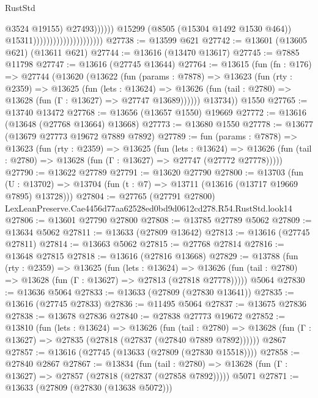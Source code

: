 \begin{lexlean}{RustStd}
\begin{coremodule}
                                                            @3524
                                                            @19155)
                                                          @27493))))))
                                              @15299
                                              (@8505 (@15304 @1492 @1530 @464))
                                              @15311)))))))))))))))))))))
@27738 := @13599 @621
@27742 := @13601 (@13605 @621) (@13611 @621)
@27744 := @13616 (@13470 @13617)
@27745 := @7885 @11798
@27747 := @13616 (@27745 @13644)
@27764 := @13615
    (fun (fn : @176) =>
    @27744
      (@13620
        (@13622
          (fun (params : @7878) =>
          @13623
            (fun (rty : @2359) =>
            @13625
              (fun (lets : @13624) =>
              @13626 (fun (tail : @2780) => @13628 (fun (Γ : @13627) => @27747 @13689))))))
        @13734))
    @1550
@27765 := @13740 @13472
@27768 := @13656 (@13657 @1550) @19669
@27772 := @13616 (@13648 (@27768 @13664) @13668)
@27773 := @13680 @1550
@27778 := @13677 (@13679 @27773 @19672 @7889 @7892)
@27789 := fun (params : @7878) =>
  @13623
    (fun (rty : @2359) =>
    @13625
      (fun (lets : @13624) =>
      @13626 (fun (tail : @2780) => @13628 (fun (Γ : @13627) => @27747 (@27772 @27778)))))
@27790 := @13622 @27789
@27791 := @13620 @27790
@27800 := @13703
    (fun (U : @13702) => @13704 (fun (t : @7) => @13711 (@13616 (@13717 @19669 @7895) @13728)))
@27804 := @27765
    (@27791 @27800)
    LexLeanPreserve.Cae4456d77aa62528ed0bd9d0612cd278.R54.RustStd.look14
@27806 := @13601 @27790 @27800
@27808 := @13785 @27789 @5062
@27809 := @13634 @5062
@27811 := @13633 (@27809 @13642)
@27813 := @13616 (@27745 @27811)
@27814 := @13663 @5062
@27815 := @27768 @27814
@27816 := @13648 @27815
@27818 := @13616 (@27816 @13668)
@27829 := @13788
    (fun (rty : @2359) =>
    @13625
      (fun (lets : @13624) =>
      @13626 (fun (tail : @2780) => @13628 (fun (Γ : @13627) => @27813 (@27818 @27778)))))
    @5064
@27830 := @13636 @5064
@27833 := @13633 (@27809 (@27830 @13641))
@27835 := @13616 (@27745 @27833)
@27836 := @11495 @5064
@27837 := @13675 @27836
@27838 := @13678 @27836
@27840 := @27838 @27773 @19672
@27852 := @13810
    (fun (lets : @13624) =>
    @13626
      (fun (tail : @2780) =>
      @13628 (fun (Γ : @13627) => @27835 (@27818 (@27837 (@27840 @7889 @7892))))))
    @2867
@27857 := @13616 (@27745 (@13633 (@27809 (@27830 @15518))))
@27858 := @27840 @2867
@27867 := @13834
    (fun (tail : @2780) => @13628 (fun (Γ : @13627) => @27857 (@27818 (@27837 (@27858 @7892)))))
    @5071
@27871 := @13633 (@27809 (@27830 (@13638 @5072)))

\end{coremodule}
\end{lexlean}
